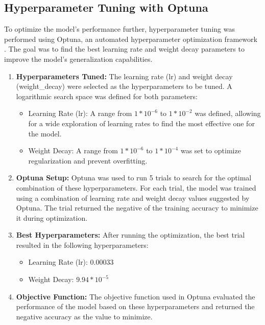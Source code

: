 \documentclass[twoside, 11pt]{article}
\begin{document}
\subsection{Hyperparameter Tuning with Optuna}
To optimize the model’s performance further, hyperparameter tuning was performed using Optuna, an automated hyperparameter optimization framework \cite{akiba2019optuna}. The goal was to find the best learning rate and weight decay parameters to improve the model's generalization capabilities.
\begin{enumerate}
    \item \textbf{Hyperparameters Tuned:} The learning rate (lr) and weight decay (weight\_decay) were selected as the hyperparameters to be tuned. A logarithmic search space was defined for both parameters:
        \begin{itemize}
            \item Learning Rate (lr): A range from $1*10^{-6}$ to $1*10^{-2}$ was defined, allowing for a wide exploration of learning rates to find the most effective one for the model.
            \item Weight Decay: A range from $1*10^{-6}$ to $1*10^{-4}$ was set to optimize regularization and prevent overfitting.
        \end{itemize}
    \item \textbf{Optuna Setup:} Optuna was used to run 5 trials to search for the optimal combination of these hyperparameters. For each trial, the model was trained using a combination of learning rate and weight decay values suggested by Optuna. The trial returned the negative of the training accuracy to minimize it during optimization.
    \item \textbf{Best Hyperparameters:} After running the optimization, the best trial resulted in the following hyperparameters:
        \begin{itemize}
            \item Learning Rate (lr): 0.00033
            \item Weight Decay: $9.94*10^{-5}$
        \end{itemize}
    \item \textbf{Objective Function:} The objective function used in Optuna evaluated the performance of the model based on these hyperparameters and returned the negative accuracy as the value to minimize.
\end{enumerate}
\end{document}
